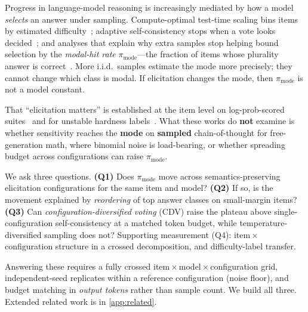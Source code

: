 \documentclass{article}
\newcommand{\pmode}{\pi_{\mathrm{mode}}}
\begin{document}
Progress in language-model reasoning is increasingly mediated by how a model
\emph{selects} an answer under sampling. Compute-optimal test-time scaling bins
items by estimated difficulty~\citep{snell2024scaling}; adaptive
self-consistency stops when a vote looks decided~\citep{aggarwal2023adaptive,li2024esc};
and analyses that explain why extra samples stop helping bound selection by the
\emph{modal-hit rate} $\pmode$---the fraction of items whose plurality answer is
correct~\citep{brown2024monkeys,blendasc2025,certifiedsc2025}. More i.i.d.\ samples
estimate the mode more precisely; they cannot change which class is modal. If
elicitation changes the mode, then $\pmode$ is not a model constant.

That ``elicitation matters'' is established at the item level on
log-prob-scored suites~\citep{brittlebench2026,tee2026} and for unstable hardness
labels~\citep{hardunreached2026}. What these works do \textbf{not} examine is
whether sensitivity reaches the \textbf{mode} on \textbf{sampled} chain-of-thought
for free-generation math, where binomial noise is load-bearing, or whether
spreading budget across configurations can raise $\pmode$.

We ask three questions. \textbf{(Q1)} Does $\pmode$ move across
semantics-preserving elicitation configurations for the same item and model?
\textbf{(Q2)} If so, is the movement explained by \emph{reordering} of top answer
classes on small-margin items? \textbf{(Q3)} Can \emph{configuration-diversified
voting} (CDV) raise the plateau above single-configuration self-consistency at a
matched token budget, while temperature-diversified sampling does not?
Supporting measurement (Q4): item\,$\times$\,configuration structure in a crossed
decomposition, and difficulty-label transfer.

Answering these requires a fully crossed item\,$\times$\,model\,$\times$\,configuration
grid, independent-seed replicates within a reference configuration (noise floor),
and budget matching in \emph{output tokens} rather than sample count. We build
all three. Extended related work is in \cref{app:related}.
\end{document}
